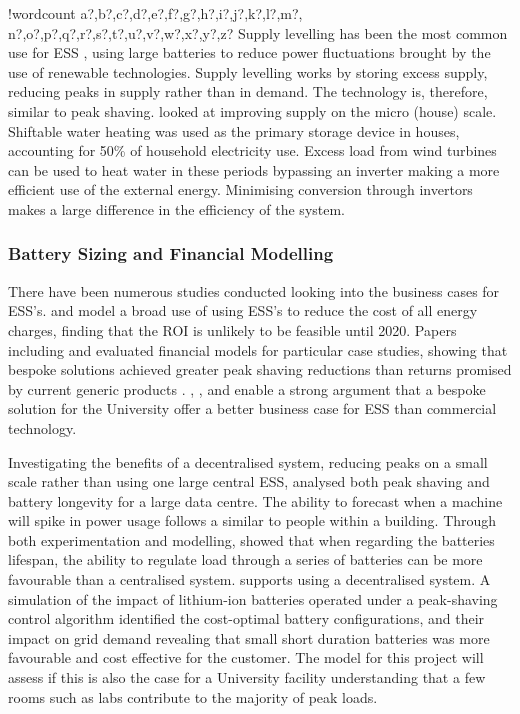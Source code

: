 \documentclass[10pt]{article}
\newcounter{words}
\newenvironment{counted}{%
  \setcounter{words}{0}
  \SearchList!{wordcount}{\stepcounter{words}}
    {a?,b?,c?,d?,e?,f?,g?,h?,i?,j?,k?,l?,m?,
    n?,o?,p?,q?,r?,s?,t?,u?,v?,w?,x?,y?,z?}
  \UndoBoundary{'}
  \SearchOrder{p;}}{%
  \StopSearching}
\begin{document}
\begin{counted}
Supply levelling has been the most common use for ESS
\cite{iearoadmapes}, using large batteries to reduce power fluctuations
brought by the use of renewable technologies. Supply levelling works by
storing excess supply, reducing peaks in supply rather than in demand.
The technology is, therefore, similar to peak shaving.
\cite{Allik20161116} looked at improving supply on the micro (house)
scale. Shiftable water heating was used as the primary storage device in
houses, accounting for 50\% of household electricity use. Excess load
from wind turbines can be used to heat water in these periods bypassing
an inverter making a more efficient use of the external energy.
Minimising conversion through invertors makes a large difference in the
efficiency of the system.

\subsubsection{Battery Sizing and Financial
Modelling}\label{battery-sizing-and-financial-modelling}

There have been numerous studies conducted looking into the business
cases for ESS's. \cite{7555795} and \cite{7555793} model a broad use of
using ESS's to reduce the cost of all energy charges, finding that the
ROI is unlikely to be feasible until 2020. Papers including
\cite{1300158} and \cite{6175723} evaluated financial models for
particular case studies, showing that bespoke solutions achieved greater
peak shaving reductions than returns promised by current generic
products \cite{abbpeakshave}. \cite{7555795}, \cite{7555793},
\cite{1300158} and \cite{6175723} enable a strong argument that a
bespoke solution for the University offer a better business case for ESS
than commercial technology.

Investigating the benefits of a decentralised system, reducing peaks on
a small scale rather than using one large central ESS, \cite{6604477}
analysed both peak shaving and battery longevity for a large data
centre. The ability to forecast when a machine will spike in power usage
follows a similar to people within a building. Through both
experimentation and modelling, \cite{6604477} showed that when regarding
the batteries lifespan, the ability to regulate load through a series of
batteries can be more favourable than a centralised system.
\cite{Demonstr51:online} supports using a decentralised system. A
simulation of the impact of lithium-ion batteries operated under a
peak-shaving control algorithm identified the cost-optimal battery
configurations, and their impact on grid demand revealing that small
short duration batteries was more favourable and cost effective for the
customer. The model for this project will assess if this is also the
case for a University facility understanding that a few rooms such as
labs contribute to the majority of peak loads.


\end{counted}
\end{document}
